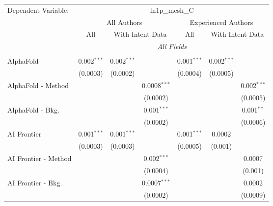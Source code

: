 \begingroup
\centering
\begin{tabular}{lcccccc}
   \tabularnewline \midrule \midrule
   Dependent Variable: & \multicolumn{6}{c}{ln1p\_mesh\_C}\\
 & \multicolumn{3}{c}{All Authors} & \multicolumn{3}{c}{Experienced Authors} \\
\cmidrule(lr){2-4} \cmidrule(lr){5-7}
 & \multicolumn{1}{c}{All} & \multicolumn{2}{c}{With Intent Data} & \multicolumn{1}{c}{All} & \multicolumn{2}{c}{With Intent Data} \\
\cmidrule(lr){2-2} \cmidrule(lr){3-4} \cmidrule(lr){5-5} \cmidrule(lr){6-7}
 & \multicolumn{6}{c}{\textit{All Fields}} \\ \\
   AlphaFold            & 0.002$^{***}$  & 0.002$^{***}$ &                & 0.001$^{***}$ & 0.002$^{***}$ &   \\   
                        & (0.0003)       & (0.0002)      &                & (0.0004)      & (0.0005)      &   \\   
   AlphaFold - Method   &                &               & 0.0008$^{***}$ &               &               & 0.002$^{***}$\\   
                        &                &               & (0.0002)       &               &               & (0.0005)\\   
   AlphaFold - Bkg.     &                &               & 0.001$^{***}$  &               &               & 0.001$^{**}$\\   
                        &                &               & (0.0002)       &               &               & (0.0006)\\   
   AI Frontier          & 0.001$^{***}$  & 0.001$^{***}$ &                & 0.001$^{***}$ & 0.0002        &   \\   
                        & (0.0003)       & (0.0003)      &                & (0.0005)      & (0.001)       &   \\   
   AI Frontier - Method &                &               & 0.002$^{***}$  &               &               & 0.0007\\   
                        &                &               & (0.0004)       &               &               & (0.001)\\   
   AI Frontier - Bkg.   &                &               & 0.0007$^{***}$ &               &               & 0.0002\\   
                        &                &               & (0.0002)       &               &               & (0.0009)\\   

\end{tabular}
